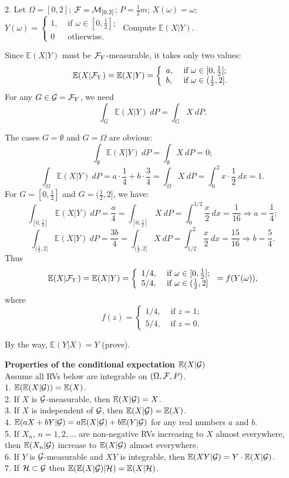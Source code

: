 \documentclass[a4paper,10pt]{article}
\def\EE{\mathbb{E}}
\newcommand{\1}[1]{\mathbf{1}_{\{#1\}}}
\begin{document}
2. Let $\Omega=[0,2]$; ${\cal F}={\cal M}_{[0,2]}$; $P=\frac{1}{2}m$; $X(\omega)=\omega$;\\ $Y(\omega)=\left\{\begin{array}{ll} 1, & \mbox{ if } \omega\in[0,\frac{1}{2}]; \\ 0 & \mbox{ otherwise}. \end{array}\right. $ Compute $\EE(X|Y)$.

Since $\EE(X|Y)$ must be ${\cal F}_Y$-measurable, it takes only two values:
  $$\EE(X|{\cal F}_Y)=\EE(X|Y)=\left\{\begin{array}{ll} a, & \mbox{ if } \omega\in[0,\frac{1}{2}]; \\ b, & \mbox{ if } \omega\in(\frac{1}{2},2]. \end{array}\right. $$
For any $G\in{\cal G}={\cal F}_Y$, we need
  $$\int_G \EE(X|Y)~dP=\int_G X~dP.$$

The cases $G=\emptyset$ and $G=\Omega$ are obvious:
  $$\int_\emptyset \EE(X|Y)~dP=\int_\emptyset X~dP=0;$$
  $$\int_\Omega \EE(X|Y)~dP=a\cdot\frac{1}{4}+b\cdot\frac{3}{4}=\int_\Omega X~dP=\int_0^2 x\cdot\frac{1}{2}~dx=1.$$
For $G=[0,\frac{1}{2}]$ and $G=(\frac{1}{2},2]$, we have:
  $$\int_{[0,\frac{1}{2}]} \EE(X|Y)~dP=\frac{a}{4}=\int_{[0,\frac{1}{2}]} X~dP=\int_0^{1/2} \frac{x}{2}~dx=\frac{1}{16}\Longrightarrow a=\frac{1}{4};$$
  $$\int_{(\frac{1}{2},2]} \EE(X|Y)~dP=\frac{3b}{4}=\int_{(\frac{1}{2},2]} X~dP=\int_{1/2}^{2} \frac{x}{2}~dx=\frac{15}{16}\Longrightarrow b=\frac{5}{4}.$$
Thus
  $$\EE(X|{\cal F}_Y)=\EE(X|Y)=\left\{\begin{array}{ll} 1/4, & \mbox{ if } \omega\in[0,\frac{1}{2}]; \\ 5/4, & \mbox{ if } \omega\in(\frac{1}{2},2] \end{array}\right.=f(Y(\omega)), $$
where
  $$f(z)=\left\{\begin{array}{ll} 1/4, & \mbox{ if }z=1; \\ 5/4, & \mbox{ if } z=0. \end{array}\right.$$

By the way, $\EE(Y|X)=Y$ (prove). \vspace{3mm}

{\bf Properties of the conditional expectation $\EE(X|{\cal G})$}\\
Assume all RVs below are integrable on $(\Omega,{\cal F},P)$.\\
1. $\EE(\EE(X|{\cal G}))=\EE(X)$.\\
2. If $X$ is ${\cal G}$-measurable, then $\EE(X|{\cal G})=X$.\\
3. If $X$ is independent of $\cal G$, then $\EE(X|{\cal G})=\EE(X)$.\\
4. $\EE(aX+bY|{\cal G})=a\EE(X|{\cal G})+b\EE(Y|{\cal G})$ for any real numbers $a$ and $b$.\\
5. If $X_n$, $n=1,2,\ldots$ are non-negative RVs increasing to $X$ almost everywhere, then $\EE(X_n|{\cal G})$ increase to $\EE(X|{\cal G})$ almost everywhere.\\
6. If $Y$ is ${\cal G}$-measurable and $XY$ is integrable, then $\EE(XY|{\cal G})=Y\cdot\EE(X|{\cal G})$.\\
7. If ${\cal H}\subset{\cal G}$ then $\EE(\EE(X|{\cal G})|{\cal H})=\EE(X|{\cal H})$.
\end{document}
